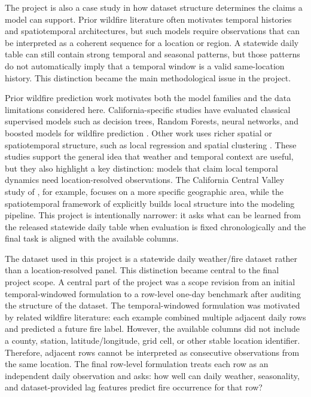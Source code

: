 \documentclass{article}
\begin{document}
The project is also a case study in how dataset structure determines the claims a model can support. Prior wildfire literature often motivates temporal histories and spatiotemporal architectures, but such models require observations that can be interpreted as a coherent sequence for a location or region. A statewide daily table can still contain strong temporal and seasonal patterns, but those patterns do not automatically imply that a temporal window is a valid same-location history. This distinction became the main methodological issue in the project.

Prior wildfire prediction work motivates both the model families and the data limitations considered here. California-specific studies have evaluated classical supervised models such as decision trees, Random Forests, neural networks, and boosted models for wildfire prediction \citep{pham2022california,hernandez2024centralvalley,hahs2024datadriven}. Other work uses richer spatial or spatiotemporal structure, such as local regression and spatial clustering \citep{xie2025spatiotemporal}. These studies support the general idea that weather and temporal context are useful, but they also highlight a key distinction: models that claim local temporal dynamics need location-resolved observations. The California Central Valley study of \citet{hernandez2024centralvalley}, for example, focuses on a more specific geographic area, while the spatiotemporal framework of \citet{xie2025spatiotemporal} explicitly builds local structure into the modeling pipeline. This project is intentionally narrower: it asks what can be learned from the released statewide daily table when evaluation is fixed chronologically and the final task is aligned with the available columns.

The dataset used in this project is a statewide daily weather/fire dataset rather than a location-resolved panel. This distinction became central to the final project scope. A central part of the project was a scope revision from an initial temporal-windowed formulation to a row-level one-day benchmark after auditing the structure of the dataset. The temporal-windowed formulation was motivated by related wildfire literature: each example combined multiple adjacent daily rows and predicted a future fire label. However, the available columns did not include a county, station, latitude/longitude, grid cell, or other stable location identifier. Therefore, adjacent rows cannot be interpreted as consecutive observations from the same location. The final row-level formulation treats each row as an independent daily observation and asks: how well can daily weather, seasonality, and dataset-provided lag features predict fire occurrence for that row?
\end{document}
